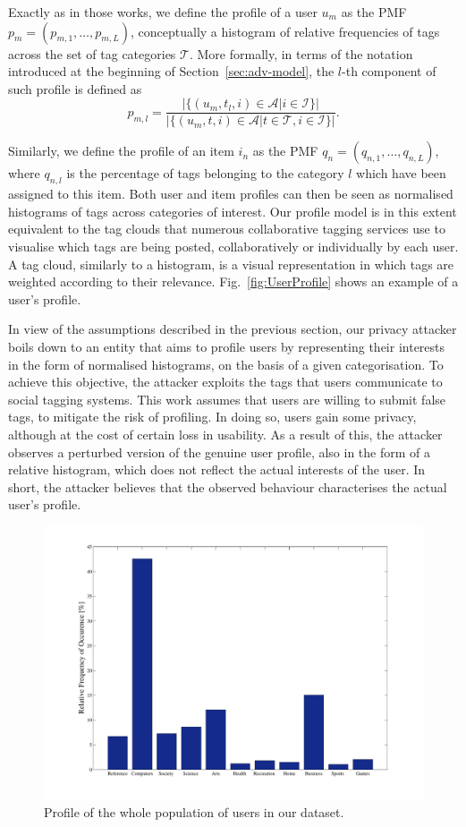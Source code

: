 Exactly as in those works, we define the profile of a user $u_m$ as the PMF $p_m = (p_{m,1},\ldots, p_{m,L})$, conceptually a histogram of relative frequencies of tags across the set of tag categories $\mathcal{T}$. More formally, in terms of the notation introduced at the beginning of Section~\ref{sec:adv-model}, the $l$-th component of such profile is defined as
$$p_{m,l} = \frac{|\{(u_m,t_l,i)\in\mathcal{A} | i\in\mathcal{I}\}|}{|\{(u_m,t,i)\in\mathcal{A} | t\in\mathcal{T}, i\in\mathcal{I}\}|}.$$

Similarly, we define the profile of an item $i_n$ as the PMF $q_n =(q_{n,1},\ldots, q_{n,L})$, where $q_{n,l}$ is the percentage of tags belonging to the category $l$ which have been assigned to this item. Both user and item profiles can then be seen as normalised histograms of tags across categories of interest. Our profile model is in this extent equivalent to the tag clouds that numerous collaborative tagging services use to visualise which tags are being posted, collaboratively or individually by each user. A tag cloud, similarly to a histogram, is a visual representation in which tags are weighted according to their relevance. Fig.~\ref{fig:UserProfile} shows an example of a user's profile.

In view of the assumptions described in the previous section, our privacy attacker boils down to an entity that aims to profile users by representing their interests in the form of normalised histograms, on the basis of a given categorisation.
To achieve this objective, the attacker exploits the tags that users communicate to social tagging systems. This work assumes that users are willing to submit false tags, to mitigate the risk of profiling. In doing so, users gain some privacy, although at the cost of certain loss in usability. As a result of this, the attacker observes a perturbed version of the genuine user profile, also in the form of a relative histogram, which does not reflect the actual interests of the user. In short, the attacker believes that the observed behaviour characterises the actual user's profile.

\begin{figure}[htb]  
\includegraphics[width=\textwidth]{figures/PPRel.pdf}
\caption[Population PMF.]{Profile of the whole population of users in our dataset.
\label{fig:PopProfile}}
\end{figure}

